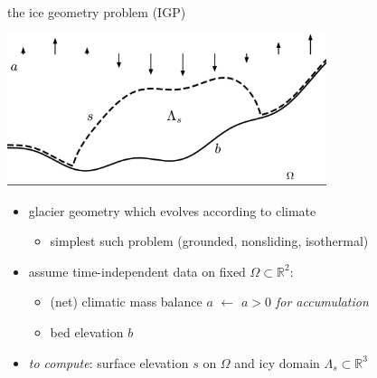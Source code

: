 \documentclass[usepdftitle=false,usenames,dvipsnames]{beamer}
\newcommand{\RR}{\mathbb{R}}
\begin{document}
\begin{frame}{the ice geometry problem (IGP)}

\vspace{-2mm}
\begin{center}
\includegraphics[width=0.7\textwidth]{figs/stokesdomain.png}
\end{center}

\vspace{-1mm}
\begin{itemize}
\item glacier geometry which evolves according to climate
    \begin{itemize}
    \item simplest such problem (grounded, nonsliding, isothermal)
    \end{itemize}
\item assume time-independent data on fixed $\Omega \subset \RR^2$:
    \begin{itemize}
    \item (net) climatic mass balance $a$ \hfill $\gets$ \emph{$a>0$ for accumulation}
    \item bed elevation $b$
    \end{itemize}
\item \emph{to compute}: surface elevation $s$ on $\Omega$ and icy domain $\Lambda_s \subset \RR^3$
\end{itemize}
\end{frame}
\end{document}
